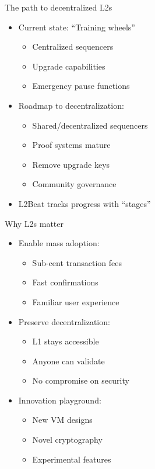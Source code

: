 \documentclass[aspectratio=169, lualatex, handout]{beamer}
\begin{document}
\begin{frame}{The path to decentralized L2s}
	\begin{itemize}
		\item Current state: ``Training wheels''
		      \begin{itemize}
			      \item Centralized sequencers
			      \item Upgrade capabilities
			      \item Emergency pause functions
		      \end{itemize}
		\item Roadmap to decentralization:
		      \begin{itemize}
			      \item Shared/decentralized sequencers
			      \item Proof systems mature
			      \item Remove upgrade keys
			      \item Community governance
		      \end{itemize}
		\item L2Beat tracks progress with ``stages''
	\end{itemize}
\end{frame}

\begin{frame}{Why L2s matter}
	\begin{itemize}
		\item Enable mass adoption:
		      \begin{itemize}
			      \item Sub-cent transaction fees
			      \item Fast confirmations
			      \item Familiar user experience
		      \end{itemize}
		\item Preserve decentralization:
		      \begin{itemize}
			      \item L1 stays accessible
			      \item Anyone can validate
			      \item No compromise on security
		      \end{itemize}
		\item Innovation playground:
		      \begin{itemize}
			      \item New VM designs
			      \item Novel cryptography
			      \item Experimental features
		      \end{itemize}
	\end{itemize}
\end{frame}
\end{document}
